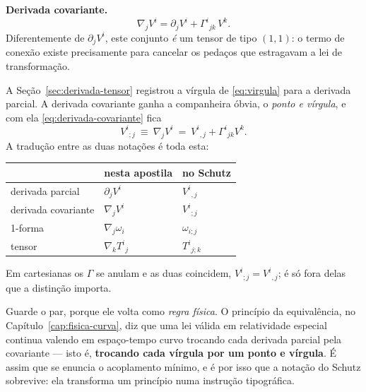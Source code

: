 \documentclass[12pt,a4paper,oneside]{book}
\theoremstyle{rgplain}
\theoremstyle{rgremark}
\begin{document}
\begin{central}
\textbf{Derivada covariante.}
\begin{equation}
  \nabla_jV^i=\partial_jV^i+\Gamma^i{}_{jk}\,V^k .
  \label{eq:derivada-covariante}
\end{equation}
Diferentemente de $\partial_jV^i$, este conjunto \emph{é} um tensor de tipo
$(1,1)$: o termo de conexão existe precisamente para cancelar os pedaços que
estragavam a lei de transformação.
\end{central}

\begin{atencao}[title={\sffamily\bfseries\footnotesize\color{rgTerracota}VÍRGULA E PONTO E VÍRGULA}]
A Seção~\ref{sec:derivada-tensor} registrou a vírgula de
\eqref{eq:virgula} para a derivada parcial. A derivada covariante ganha a
companheira óbvia, o \emph{ponto e vírgula}, e com ela
\eqref{eq:derivada-covariante} fica
\begin{equation}
  V^i{}_{;j}\ \equiv\ \nabla_jV^i\ =\ V^i{}_{,j}+\Gamma^i{}_{jk}V^k .
  \label{eq:ponto-e-virgula}
\end{equation}
A tradução entre as duas notações é toda esta:
\begin{center}
\small
\begin{tabular}{lll}
\toprule
 & nesta apostila & no Schutz \\
\midrule
derivada parcial    & $\partial_jV^i$ & $V^i{}_{,j}$ \\
derivada covariante & $\nabla_jV^i$   & $V^i{}_{;j}$ \\
1-forma             & $\nabla_j\omega_i$ & $\omega_{i;j}$ \\
tensor              & $\nabla_kT^i{}_j$ & $T^i{}_{j;k}$ \\
\bottomrule
\end{tabular}
\end{center}
Em cartesianas os $\Gamma$ se anulam e as duas coincidem, $V^i{}_{;j}=V^i{}_{,j}$;
é só fora delas que a distinção importa.

Guarde o par, porque ele volta como \emph{regra física}. O princípio da
equivalência, no Capítulo~\ref{cap:fisica-curva}, diz que uma lei válida em
relatividade especial continua valendo em espaço-tempo curvo trocando cada
derivada parcial pela covariante --- isto é, \textbf{trocando cada vírgula por
um ponto e vírgula}. É assim que se enuncia o acoplamento mínimo, e é por isso
que a notação do Schutz sobrevive: ela transforma um princípio numa instrução
tipográfica.
\end{atencao}
\end{document}
